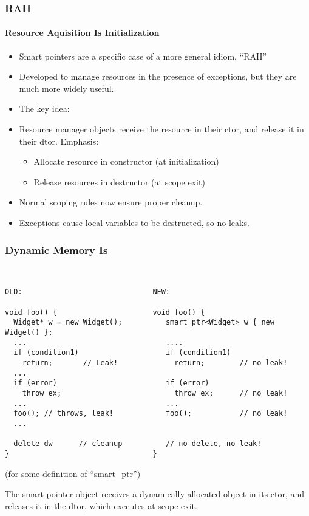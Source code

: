 \begin{frame}[fragile,t]
\frametitle{RAII}
\framesubtitle{Resource Aquisition Is Initialization}
\begin{itemize}
\item Smart pointers are a specific case of a more general idiom, ``RAII''
\item Developed to manage resources in the presence of exceptions, but
  they are much more widely useful.
\item The key idea:  
\item Resource manager objects receive the resource in their
  ctor, and release it in their dtor.  Emphasis:
\begin{itemize}
  \item Allocate resource in constructor (at initialization)
  \item Release resources in destructor (at scope exit)
\end{itemize}
\item Normal scoping rules now ensure proper cleanup.
\item Exceptions cause local variables to be destructed, so no leaks.
\end{itemize}
\vskip 12pt
\pause{}
\pause{}
\center{\Emph{\texttt{\}}}}

\end{frame}


\begin{frame}[fragile,t]
\frametitle{Dynamic Memory Is }
{\scriptsize\
\begin{verbatim}
OLD:                              NEW:

void foo() {                      void foo() {
  Widget* w = new Widget();          smart_ptr<Widget> w { new Widget() };
  ...                                ....
  if (condition1)                    if (condition1) 
    return;       // Leak!             return;        // no leak!
  ...
  if (error)                         if (error)
    throw ex;                          throw ex;      // no leak!
  ...                                ...
  foo(); // throws, leak!            foo();           // no leak!
  ...             

  delete dw      // cleanup          // no delete, no leak!
}                                 } 
\end{verbatim}
}

(for some definition of ``smart\_ptr'')

The smart pointer object receives a dynamically allocated object in
its ctor, and releases it in the dtor, which executes at scope exit.
\end{frame}

